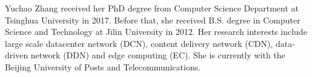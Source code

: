 \documentclass[10pt,journal,compsoc]{IEEEtran}
\begin{document}
%


%
%


%
%
%


%
%
%





%

%
%

%
%
%

%


%
%








%


\newpage

\begin{IEEEbiography}
{Yuchao Zhang} received her PhD degree from Computer Science Department at Tsinghua University in 2017. Before that, she received B.S. degree in Computer Science and Technology at Jilin University in 2012. Her research interests include large scale datacenter network (DCN), content delivery network (CDN), data-driven network (DDN) and edge computing (EC). She is currently with the Beijing University of Posts and Telecommunications.
\end{IEEEbiography}
\end{document}
